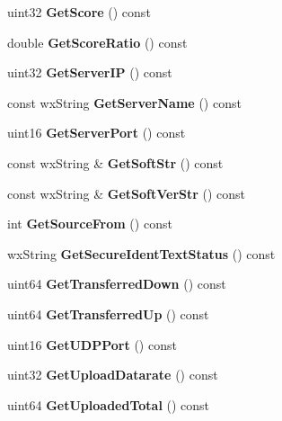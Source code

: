 \begin{DoxyCompactItemize}
\item 
uint32 {\bfseries GetScore} () const \label{classCClientRef_a48eeb7ddcc6735bbde8c104efbb6e5e6}

\item 
double {\bfseries GetScoreRatio} () const \label{classCClientRef_a033df43689bf559f8b34483bcef59cfa}

\item 
uint32 {\bfseries GetServerIP} () const \label{classCClientRef_a684edc1ca0ab4bedb4253da9b1e923bf}

\item 
const wxString {\bfseries GetServerName} () const \label{classCClientRef_a15c0dd534d0abb194eedeec64a80864c}

\item 
uint16 {\bfseries GetServerPort} () const \label{classCClientRef_aa635e311899c789639454b11dc06b6b0}

\item 
const wxString \& {\bfseries GetSoftStr} () const \label{classCClientRef_ab023428b1aa83e2532e722a868b01810}

\item 
const wxString \& {\bfseries GetSoftVerStr} () const \label{classCClientRef_a58b506a0cc79fb4058095558deae31f6}

\item 
int {\bfseries GetSourceFrom} () const \label{classCClientRef_a989157dc495c1c0653efc6282f4fa18a}

\item 
wxString {\bfseries GetSecureIdentTextStatus} () const \label{classCClientRef_adc6187c1b30f8546a9b35a85c19269ab}

\item 
uint64 {\bfseries GetTransferredDown} () const \label{classCClientRef_a2c83f643a9af727a6f53c03ceea8eccf}

\item 
uint64 {\bfseries GetTransferredUp} () const \label{classCClientRef_ac929854eb2325da4de714e617caccc0d}

\item 
uint16 {\bfseries GetUDPPort} () const \label{classCClientRef_a994a82482aa21515f7c3e4352a9febb6}

\item 
uint32 {\bfseries GetUploadDatarate} () const \label{classCClientRef_a05d40f1d9d12b590339d36d4cd4e37b4}

\item 
uint64 {\bfseries GetUploadedTotal} () const \label{classCClientRef_a55a4d3fd9ff5622ad1df3de18b44669a}


\end{DoxyCompactItemize}
